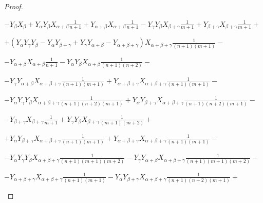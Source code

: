 \documentclass[twoside,a4paper,12pt]{article}
\theoremstyle{definition}
\newcommand{\ds}{\displaystyle}
\begin{document}
\begin{proof}
\begin{flushleft}
	\end{flushleft}
	\begin{flushright}
		$\ds -Y_\beta X_\beta+Y_\alpha Y_\beta X_{\alpha+\beta}\frac1{n+1}
		+Y_{\alpha+\beta}X_{\alpha+\beta}\frac1{n+1}-
		Y_\gamma Y_\beta X_{\beta+\gamma}\frac1{m+1}
		+Y_{\beta+\gamma}X_{\beta+\gamma}\frac1{m+1}+$
	\end{flushright}
	\begin{flushright}
		$\ds +\left(Y_\alpha Y_\gamma Y_\beta-Y_\alpha Y_{\beta+\gamma}
		+Y_\gamma Y_{\alpha+\beta}-Y_{\alpha+\beta+\gamma}\right)
		X_{\alpha+\beta+\gamma}\frac1{(n+1)(m+1)}-$
	\end{flushright}
	\begin{flushright}
		$\ds -Y_{\alpha+\beta}X_{\alpha+\beta}\frac1{n+1}
		-Y_\alpha Y_\beta X_{\alpha+\beta}\frac1{(n+1)(n+2)}-$
	\end{flushright}
	\begin{flushright}
		$\ds-Y_\gamma Y_{\alpha+\beta} X_{\alpha+\beta+\gamma}\frac1{(n+1)(m+1)}
		+Y_{\alpha+\beta+\gamma}X_{\alpha+\beta+\gamma}\frac1{(n+1)(m+1)}-$
	\end{flushright}
	\begin{flushright}
		$\ds -Y_\alpha Y_\gamma Y_\beta X_{\alpha+\beta+\gamma}
		\frac1{(n+1)(n+2)(m+1)}
		+Y_\alpha Y_{\beta+\gamma}X_{\alpha+\beta+\gamma}
		\frac1{(n+1)(n+2)(m+1)}-$
	\end{flushright}
	\begin{flushright}
		$\ds -Y_{\beta+\gamma}X_{\beta+\gamma}\frac1{m+1}
		+Y_\gamma Y_\beta X_{\beta+\gamma}\frac1{(m+1)(m+2)}+$
	\end{flushright}
	\begin{flushright}
		$\ds+Y_\alpha Y_{\beta+\gamma} X_{\alpha+\beta+\gamma}\frac1{(n+1)(m+1)}
		+Y_{\alpha+\beta+\gamma}X_{\alpha+\beta+\gamma}\frac1{(n+1)(m+1)}-$
	\end{flushright}
	\begin{flushright}
		$\ds -Y_\alpha Y_\gamma Y_\beta X_{\alpha+\beta+\gamma}
		\frac1{(n+1)(m+1)(m+2)}
		-Y_\gamma Y_{\alpha+\beta}X_{\alpha+\beta+\gamma}
		\frac1{(n+1)(m+1)(m+2)}-$
	\end{flushright}
	\begin{flushright}
		$\ds -Y_{\alpha+\beta+\gamma}X_{\alpha+\beta+\gamma}\frac1{(n+1)(m+1)}
		-Y_\alpha Y_{\beta+\gamma}X_{\alpha+\beta+\gamma}
		\frac1{(n+1)(n+2)(m+1)}+$
	\end{flushright}
\end{proof}
\end{document}

